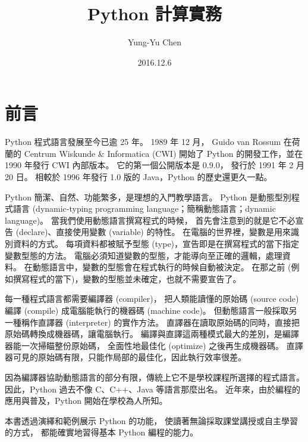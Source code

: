 \documentclass[a4paper,12pt]{book}
\theoremstyle{definition}
\begin{document}
\title{Python 計算實務}
\author{Yung-Yu Chen}
\date{2016.12.6}

\maketitle

\tableofcontents

\hspace{.5cm}

\frontmatter

\chapter{前言}

%
%

Python 程式語言發展至今已逾 25 年。
1989 年 12 月，
Guido van Rossum 在荷蘭的 Centrum Wiskunde \& Informatica (CWI) 開始了
Python 的開發工作，並在 1990 年發行 CWI 內部版本。
它的第一個公開版本是 0.9.0，
發行於 1991 年 2 月 20 日\cite{rossum_brief_2009}。
相較於 1996 年發行 1.0 版的 Java，Python 的歷史還更久一點。

Python 簡潔、自然、功能繁多，是理想的入門教學語言。
Python 是動態型別程式語言
(dynamic-typing programming language；簡稱動態語言；dynamic language)。
當我們使用動態語言撰寫程式的時候，
首先會注意到的就是它不必宣告 (declare)、直接使用變數 (variable) 的特性。
在電腦的世界裡，變數是用來識別資料的方式。
每項資料都被賦予型態 (type)，宣告即是在撰寫程式的當下指定變數型態的方法。
電腦必須知道變數的型態，才能導向至正確的邏輯，處理資料。
在動態語言中，變數的型態會在程式執行的時候自動被決定。
在那之前 (例如撰寫程式的當下)，變數的型態並未確定，也就不需要宣告了。

每一種程式語言都需要編譯器 (compiler)，
把人類能讀懂的原始碼 (source code)
編譯 (compile) 成電腦能執行的機器碼 (machine code)。
但動態語言一般採取另一種稱作直譯器 (interpreter) 的實作方法。
直譯器在讀取原始碼的同時，直接把原始碼轉換成機器碼，讓電腦執行。
編譯與直譯這兩種模式最大的差別，是編譯器能一次掃瞄整份原始碼，
全面性地最佳化 (optimize) 之後再生成機器碼。
直譯器可見的原始碼有限，只能作局部的最佳化，因此執行效率很差。

因為編譯器協助動態語言的部分有限，傳統上它不是學校課程所選擇的程式語言。
因此，Python 過去不像 C、C++、Java 等語言那麼出名。
近年來，由於編程的應用與普及，Python 開始在學校為人所知。

本書透過演繹和範例展示 Python 的功能，
使讀著無論採取課堂講授或自主學習的方式，
都能確實地習得基本 Python 編程的能力。
\end{document}
